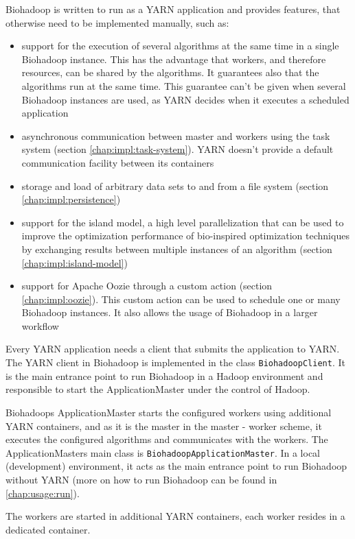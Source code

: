 Biohadoop is written to run as a YARN application and provides features, that otherwise need to be implemented manually, such as:

\begin{itemize}
  \item support for the execution of several algorithms at the same time in a single Biohadoop instance. This has the advantage that workers, and therefore resources, can be shared by the algorithms. It guarantees also that the algorithms run at the same time. This guarantee can't be given when several Biohadoop instances are used, as YARN decides when it executes a scheduled application
  \item asynchronous communication between master and workers using the task system (section \ref{chap:impl:task-system}). YARN doesn't provide a default communication facility between its containers
  \item storage and load of arbitrary data sets to and from a file system (section \ref{chap:impl:persistence})
  \item support for the island model, a high level parallelization that can be used to improve the optimization performance of bio-inspired optimization techniques by exchanging results between multiple instances of an algorithm (section \ref{chap:impl:island-model})
  \item support for Apache Oozie through a custom action (section \ref{chap:impl:oozie}). This custom action can be used to schedule one or many Biohadoop instances. It also allows the usage of Biohadoop in a larger workflow
\end{itemize}

Every YARN application needs a client that submits the application to YARN. The YARN client in Biohadoop is implemented in the class \texttt{BiohadoopClient}. It is the main entrance point to run Biohadoop in a Hadoop environment and responsible to start the ApplicationMaster under the control of Hadoop.

Biohadoops ApplicationMaster starts the configured workers using additional YARN containers, and as it is the master in the master - worker scheme, it executes the configured algorithms and communicates with the workers. The ApplicationMasters main class is \texttt{BiohadoopApplicationMaster}. In a local (development) environment, it acts as the main entrance point to run Biohadoop without YARN (more on how to run Biohadoop can be found in \ref{chap:usage:run}).

The workers are started in additional YARN containers, each worker resides in a dedicated container.

